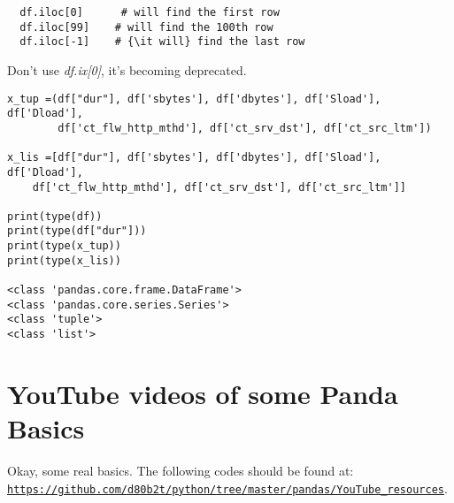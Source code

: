 \documentclass[11pt,a4paper]{article}
\begin{document}
\begin{lstlisting}
  df.iloc[0]      # will find the first row
  df.iloc[99]    # will find the 100th row
  df.iloc[-1]    # {\it will} find the last row
\end{lstlisting}
Don't use {\it df.ix[0]}, it's becoming deprecated.


\begin{lstlisting}
x_tup =(df["dur"], df['sbytes'], df['dbytes'], df['Sload'], df['Dload'],
        df['ct_flw_http_mthd'], df['ct_srv_dst'], df['ct_src_ltm'])

x_lis =[df["dur"], df['sbytes'], df['dbytes'], df['Sload'], df['Dload'],
    df['ct_flw_http_mthd'], df['ct_srv_dst'], df['ct_src_ltm']]

print(type(df))
print(type(df["dur"]))
print(type(x_tup))
print(type(x_lis))

<class 'pandas.core.frame.DataFrame'>
<class 'pandas.core.series.Series'>
<class 'tuple'>
<class 'list'>
\end{lstlisting}







\clearpage
\noindent
\section{YouTube videos of some Panda Basics}
Okay, some real basics. The following codes should be found at:\\
\href{https://github.com/d80b2t/python/tree/master/pandas/YouTube_resources}{{\tt https://github.com/d80b2t/python/tree/master/pandas/YouTube\_resources}}. 
\end{document}

